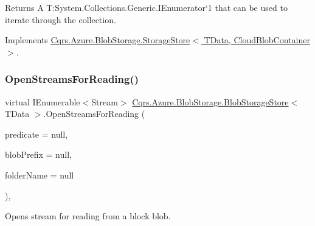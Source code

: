 \begin{DoxyReturn}{Returns}
A T\+:\+System.\+Collections.\+Generic.\+I\+Enumerator`1 that can be used to iterate through the collection. 
\end{DoxyReturn}


Implements \hyperlink{classCqrs_1_1Azure_1_1BlobStorage_1_1StorageStore_a2eb689ea51d586309b79d6cbac05b616}{Cqrs.\+Azure.\+Blob\+Storage.\+Storage\+Store$<$ T\+Data, Cloud\+Blob\+Container $>$}.

\mbox{\label{classCqrs_1_1Azure_1_1BlobStorage_1_1BlobStorageStore_a6a916e23890ba65048e449353bbd17c2}} 
\subsubsection{\texorpdfstring{Open\+Streams\+For\+Reading()}{OpenStreamsForReading()}}
{\footnotesize\ttfamily virtual I\+Enumerable$<$Stream$>$ \hyperlink{classCqrs_1_1Azure_1_1BlobStorage_1_1BlobStorageStore}{Cqrs.\+Azure.\+Blob\+Storage.\+Blob\+Storage\+Store}$<$ T\+Data $>$.Open\+Streams\+For\+Reading (\begin{DoxyParamCaption}\item[{Func$<$ Cloud\+Block\+Blob, bool $>$}]{predicate = {\ttfamily null},  }\item[{string}]{blob\+Prefix = {\ttfamily null},  }\item[{string}]{folder\+Name = {\ttfamily null} }\end{DoxyParamCaption})\hspace{0.3cm}{\ttfamily [protected]}, {\ttfamily [virtual]}}



Opens stream for reading from a block blob. 

\mbox{\label{classCqrs_1_1Azure_1_1BlobStorage_1_1BlobStorageStore_a4371b95250e51b8462d8ab33b6f3fe9e}} 

